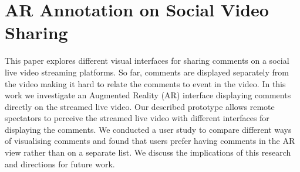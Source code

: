 
\section{AR Annotation on Social Video Sharing}
\label{sec:video}





This paper explores different visual interfaces for sharing comments on a social live video streaming platforms. So far, comments are displayed separately from the video making it hard to relate the comments to event in the video. In this work we investigate an Augmented Reality (AR) interface displaying comments directly on the streamed live video. Our described prototype allows remote spectators to perceive the streamed live video with different interfaces for displaying the comments. We conducted a user study to compare different ways of visualising comments and found that users prefer having comments in the AR view rather than on a separate list. We discuss the implications of this research and directions for future work.



